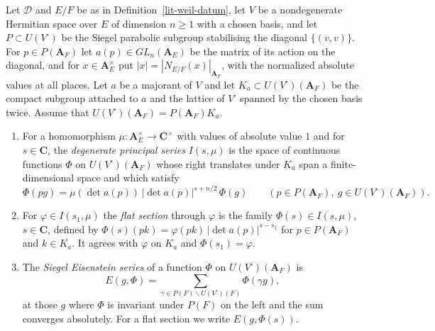 \begin{definition}\label{lit-siegel-eisenstein}
Let $\mathcal D$ and $E/F$ be as in Definition~\ref{lit-weil-datum}, let $V$
be a nondegenerate Hermitian space over $E$ of dimension $n\ge1$ with a chosen
basis, and let $P\subset U(V^\square)$ be the Siegel parabolic subgroup
stabilising the diagonal $\{(v,v)\}$. For $p\in P(\mathbf A_F)$ let
$a(p)\in GL_n(\mathbf A_E)$ be the matrix of its action on the diagonal, and
for $x\in\mathbf A_E^\times$ put $|x|=|N_{E/F}(x)|_{\mathbf A_F}$, with the
normalized absolute values at all places. Let $a$ be a majorant of $V$ and
let $K_a\subset U(V^\square)(\mathbf A_F)$ be the compact subgroup attached to
$a$ and the lattice of $V^\square$ spanned by the chosen basis twice. Assume
that $U(V^\square)(\mathbf A_F)=P(\mathbf A_F)K_a$.
\begin{enumerate}
\item For a homomorphism $\mu:\mathbf A_E^\times\to\mathbf C^\times$ with
  values of absolute value $1$ and for $s\in\mathbf C$, the
  \emph{degenerate principal series} $I(s,\mu)$ is the space of continuous
  functions $\Phi$ on $U(V^\square)(\mathbf A_F)$ whose right translates
  under $K_a$ span a finite-dimensional space and which satisfy
  \[
  \Phi(pg)=\mu(\det a(p))\,|\det a(p)|^{s+n/2}\,\Phi(g)
  \qquad(p\in P(\mathbf A_F),\ g\in U(V^\square)(\mathbf A_F)).
  \]
\item For $\varphi\in I(s_1,\mu)$ the \emph{flat section} through $\varphi$ is
  the family $\Phi(s)\in I(s,\mu)$, $s\in\mathbf C$, defined by
  $\Phi(s)(pk)=\varphi(pk)\,|\det a(p)|^{s-s_1}$ for $p\in P(\mathbf A_F)$
  and $k\in K_a$. It agrees with $\varphi$ on $K_a$ and $\Phi(s_1)=\varphi$.
\item The \emph{Siegel Eisenstein series} of a function $\Phi$ on
  $U(V^\square)(\mathbf A_F)$ is
  \[
  E(g,\Phi)=\sum_{\gamma\in P(F)\backslash U(V^\square)(F)}\Phi(\gamma g),
  \]
  at those $g$ where $\Phi$ is invariant under $P(F)$ on the left and the sum
  converges absolutely. For a flat section we write $E(g,\Phi(s))$.
\end{enumerate}
\end{definition}

